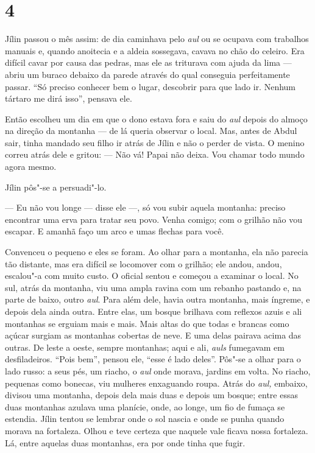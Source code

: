 \section{4}

Jílin passou o mês assim: de dia caminhava pelo \emph{aul} ou se ocupava
com trabalhos manuais e, quando anoitecia e a aldeia sossegava, cavava
no chão do celeiro. Era difícil cavar por causa das pedras, mas ele as
triturava com ajuda da lima --- abriu um buraco debaixo da parede
através do qual conseguia perfeitamente passar. ``Só preciso conhecer
bem o lugar, descobrir para que lado ir. Nenhum tártaro me dirá isso'',
pensava ele.

Então escolheu um dia em que o dono estava fora e saiu do \emph{aul} depois do almoço 
na direção da montanha --- de lá queria observar o local.
Mas, antes de Abdul sair, tinha mandado seu filho ir atrás de Jílin e
não o perder de vista. O menino correu atrás dele e gritou:
--- Não vá! Papai não deixa. Vou chamar todo mundo agora mesmo.

Jílin pôs"-se a persuadi"-lo.

--- Eu não vou longe --- disse ele ---, só vou subir aquela montanha:
preciso encontrar uma erva para tratar seu povo. Venha comigo; com o
grilhão não vou escapar. E amanhã faço um arco e umas flechas para você.

Convenceu o pequeno e eles se foram. Ao olhar para a montanha, ela não
parecia tão distante, mas era difícil se locomover com o grilhão; ele
andou, andou, escalou"-a com muito custo. O oficial sentou e começou a
examinar o local. No sul, atrás da montanha, viu uma ampla ravina com um
rebanho pastando e, na parte de baixo, outro \emph{aul}. Para além
dele, havia outra montanha, mais íngreme, e depois dela ainda
outra. Entre elas, um bosque brilhava com reflexos azuis e ali montanhas
se erguiam mais e mais. Mais altas do que todas e brancas como açúcar
surgiam as montanhas cobertas de neve. E uma delas pairava acima das
outras. De leste a oeste, sempre montanhas; aqui e ali, \emph{auls}
fumegavam em desfiladeiros. ``Pois bem'', pensou ele, ``esse é lado
deles''. Pôs"-se a olhar para o lado russo: a seus pés, um riacho, o
\emph{aul} onde morava, jardins em volta. No riacho, pequenas
como bonecas, viu mulheres enxaguando roupa. Atrás do \emph{aul,}
embaixo, divisou uma montanha, depois dela mais duas e depois um bosque;
entre essas duas montanhas azulava uma planície, onde, ao longe, um fio
de fumaça se estendia. Jílin tentou se lembrar onde o sol nascia e onde
se punha quando morava na fortaleza. Olhou e teve certeza que naquele
vale ficava nossa fortaleza. Lá, entre aquelas duas montanhas, era por
onde tinha que fugir.

